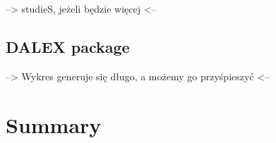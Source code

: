 --\textgreater{} studieS, jeżeli będzie więcej \textless--

\subsection{DALEX package}\label{dalex-package}

--\textgreater{} Wykres generuje się długo, a możemy go przyśpieszyć \textless--

\section{Summary}\label{summary}



\address{%
Błażej Kochański\\
\\%
\\
%
%
%
%
}

\address{%
Przemysław Pepliński\\
Gdańsk University of Technology\\%
Faculty of Management and Economics\\ Gdańsk\\
%
%
%
%
}

\address{%
Miriam Nieslona\\
\\%
\\
%
%
%
%
}

\address{%
Wiktor Galewski\\
\\%
\\
%
%
%
%
}

\address{%
Piotr Geremek\\
\\%
\\
%
%
%
%
}
